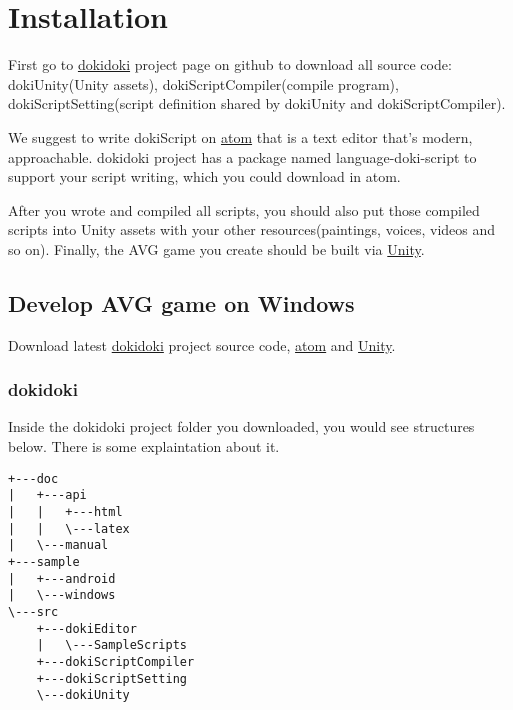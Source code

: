 \chapter{Installation}

First go to \href{https://github.com/kesumu/dokidoki}{dokidoki} project page on github to download all source code: dokiUnity(Unity assets), dokiScriptCompiler(compile program), dokiScriptSetting(script definition shared by dokiUnity and dokiScriptCompiler).

We suggest to write dokiScript on \href{https://atom.io/}{atom} that is a text editor that's modern, approachable. dokidoki project has a package named language-doki-script to support your script writing, which you could download in atom.

After you wrote and compiled all scripts, you should also put those compiled scripts into Unity assets with your other resources(paintings, voices, videos and so on). Finally, the AVG game you create should be built via \href{http://unity3d.com/}{Unity}.

\section{Develop AVG game on Windows}

Download latest \href{https://github.com/kesumu/dokidoki}{dokidoki} project source code,  \href{https://atom.io/}{atom} and \href{http://unity3d.com/}{Unity}.

\subsection{dokidoki}

Inside the dokidoki project folder you downloaded, you would see structures below. There is some explaintation about it.

\begin{lstlisting}
+---doc
|   +---api
|   |   +---html
|   |   \---latex
|   \---manual
+---sample
|   +---android
|   \---windows
\---src
    +---dokiEditor
    |   \---SampleScripts
    +---dokiScriptCompiler   
    +---dokiScriptSetting    
    \---dokiUnity
\end{lstlisting}

